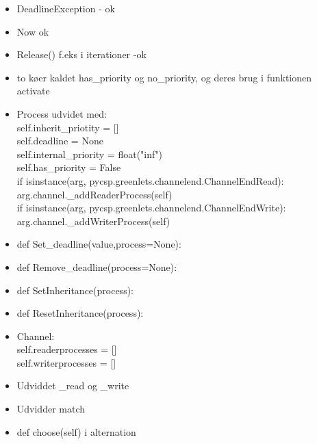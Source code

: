 \begin{itemize}
\tightlist
\item DeadlineException - ok
\item Now ok
\item Release() f.eks i iterationer -ok
\item to køer kaldet has\_priority og no\_priority, og deres brug i funktionen activate
\item Process udvidet med: \\self.inherit\_priotity = []     \\
        self.deadline = None\\
        self.internal\_priority = float("inf")\\
        self.has\_priority = False\\
            if isinstance(arg, pycsp.greenlets.channelend.ChannelEndRead):\\
                arg.channel.\_addReaderProcess(self)\\
            if isinstance(arg, pycsp.greenlets.channelend.ChannelEndWrite):\\
                arg.channel.\_addWriterProcess(self)
\item def Set\_deadline(value,process=None):
\item def Remove\_deadline(process=None):
\item def SetInheritance(process):
\item def ResetInheritance(process):
\item Channel:\\
        self.readerprocesses = []\\
        self.writerprocesses = []

\item Udviddet \_read og \_write
\item Udvidder match
\item     def choose(self) i alternation


\end{itemize}
